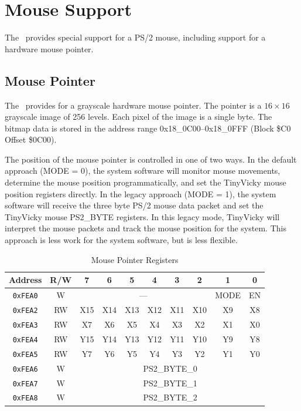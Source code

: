 \section*{Mouse Support}

The \jr\ provides special support for a PS/2 mouse, including support for a hardware mouse pointer.

\subsection*{Mouse Pointer}

The \jr\ provides for a grayscale hardware mouse pointer. The pointer is a $16 \times 16$ grayscale image of 256 levels. Each pixel of the image is a single byte. The bitmap data is stored in the address range 0x18\_0C00--0x18\_0FFF (Block \$C0 Offset \$0C00).

The position of the mouse pointer is controlled in one of two ways. In the default approach (MODE = 0), the system software will monitor mouse movements, determine the mouse position programmatically, and set the TinyVicky mouse position registers directly. In the legacy approach (MODE = 1), the system software will receive the three byte PS/2 mouse data packet and set the TinyVicky mouse PS2\_BYTE registers. In this legacy mode, TinyVicky will interpret the mouse packets and track the mouse position for the system. This approach is less work for the system software, but is less flexible.

\begin{table}[ht]
    \begin{center}
        \begin{tabular}{|c|c|c|c|c|c|c|c|c|c|} \hline
            Address & R/W & 7 & 6 & 5 & 4 & 3 & 2 & 1 & 0 \\\hline\hline
            \verb+0xFEA0+ & W & \multicolumn{6}{|c|}{---} & MODE & EN \\\hline
            \verb+0xFEA2+ & RW & X15 & X14 & X13 & X12 & X11 & X10 & X9 & X8 \\\hline
            \verb+0xFEA3+ & RW & X7 & X6 & X5 & X4 & X3 & X2 & X1 & X0 \\\hline
            \verb+0xFEA4+ & RW & Y15 & Y14 & Y13 & Y12 & Y11 & Y10 & Y9 & Y8 \\\hline
            \verb+0xFEA5+ & RW & Y7 & Y6 & Y5 & Y4 & Y3 & Y2 & Y1 & Y0 \\\hline
            \verb+0xFEA6+ & W & \multicolumn{8}{|c|}{PS2\_BYTE\_0} \\\hline
            \verb+0xFEA7+ & W & \multicolumn{8}{|c|}{PS2\_BYTE\_1} \\\hline
            \verb+0xFEA8+ & W & \multicolumn{8}{|c|}{PS2\_BYTE\_2} \\\hline
        \end{tabular}
    \end{center}
    \caption{Mouse Pointer Registers}
    \label{tab:mouse_reg}
\end{table}


